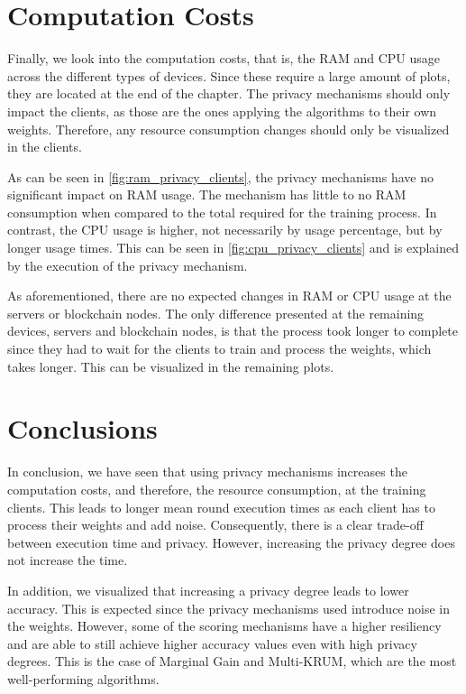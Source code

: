 \section{Computation Costs}

Finally, we look into the computation costs, that is, the RAM and CPU usage across the different types of devices. Since these require a large amount of plots, they are located at the end of the chapter. The privacy mechanisms should only impact the clients, as those are the ones applying the algorithms to their own weights. Therefore, any resource consumption changes should only be visualized in the clients.

As can be seen in \autoref{fig:ram_privacy_clients}, the privacy mechanisms have no significant impact on RAM usage. The mechanism has little to no RAM consumption when compared to the total required for the training process. In contrast, the CPU usage is higher, not necessarily by usage percentage, but by longer usage times. This can be seen in \autoref{fig:cpu_privacy_clients} and is explained by the execution of the privacy mechanism.

As aforementioned, there are no expected changes in RAM or CPU usage at the servers or blockchain nodes.  The only difference presented at the remaining devices, servers and blockchain nodes, is that the process took longer to complete since they had to wait for the clients to train and process the weights, which takes longer. This can be visualized in the remaining plots.

\section{Conclusions}

In conclusion, we have seen that using privacy mechanisms increases the computation costs, and therefore, the resource consumption, at the training clients. This leads to longer mean round execution times as each client has to process their weights and add noise. Consequently, there is a clear trade-off between execution time and privacy. However, increasing the privacy degree does not increase the time.

In addition, we visualized that increasing a privacy degree leads to lower accuracy. This is expected since the privacy mechanisms used introduce noise in the weights. However, some of the scoring mechanisms have a higher resiliency and are able to still achieve higher accuracy values even with high privacy degrees. This is the case of Marginal Gain and Multi-KRUM, which are the most well-performing algorithms.

